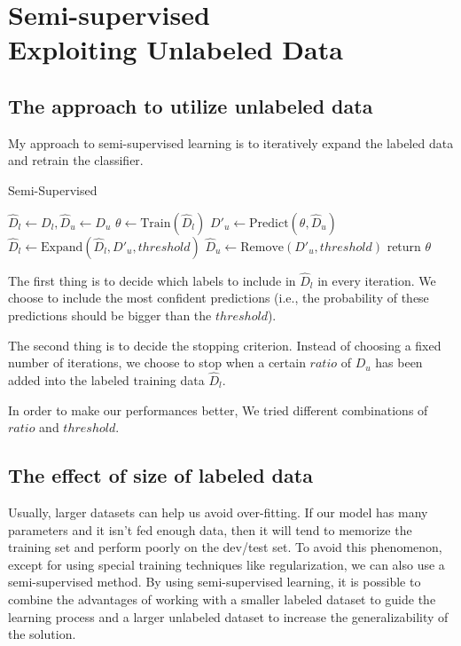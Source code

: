 \section{\textbf{Semi-supervised\\ Exploiting Unlabeled Data}}

\subsection{\textbf{The approach to utilize unlabeled data}}

My approach to semi-supervised learning is to iteratively expand the labeled data and retrain the classifier.

\begin{algorithm}[]
  \caption{Semi-Supervised}
  $\hat{D}_l \leftarrow D_l, \hat{D}_u \leftarrow D_u$\;
  {
    $\theta \leftarrow \text{Train}(\hat{D}_l)$\;
    $D'_u \leftarrow \text{Predict}(\theta, \hat{D}_u)$\;
    $\hat{D}_l \leftarrow \text{Expand}(\hat{D}_l, D'_u, threshold)$\;
    $\hat{D}_u \leftarrow \text{Remove}(D'_u, threshold)$\;
  }
  return $\theta$\;
\end{algorithm}

The first thing is to decide which labels to include in $\hat{D}_l$ in every iteration. We choose to include the most confident predictions (i.e., the probability of these predictions should be bigger than the $threshold$).

The second thing is to decide the stopping criterion. Instead of choosing a fixed number of iterations, we choose to stop when a certain $ratio$ of $D_u$ has been added into the labeled training data $\hat{D}_l$.

In order to make our performances better, We tried different combinations of $ratio$ and $threshold$.

\subsection{\textbf{The effect of size of labeled data}}

Usually, larger datasets can help us avoid over-fitting. If our model has many parameters and it isn't fed enough data, then it will tend to memorize the training set and perform poorly on the dev/test set. To avoid this phenomenon, except for using special training techniques like regularization, we can also use a semi-supervised method. By using semi-supervised learning, it is possible to combine the advantages of working with a smaller labeled dataset to guide the learning process and a larger unlabeled dataset to increase the generalizability of the solution. 

